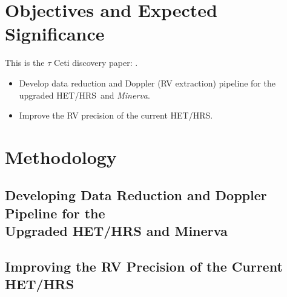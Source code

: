 \documentclass[12pt]{article}
\def\minerva{{\it Minerva}}
\def\hrs{HET/HRS}
\begin{document}

\section{Objectives and Expected Significance}






This is the $\tau$ Ceti discovery paper: \cite{tuomi2013}.

\begin{itemize}[leftmargin=2.2em]
    \vspace{-3pt}
\item Develop data reduction and Doppler (RV extraction) pipeline
  for the upgraded \hrs\ and \minerva.
    \vspace{-3pt}
\end{itemize}


\begin{itemize}[leftmargin=2.2em]
  \vspace{-3pt}
\item Improve the RV precision of the current \hrs.
  \vspace{-3pt}
\end{itemize}




\vspace{-3pt}
\section{Methodology}


\vspace{-3pt}
\subsection{Developing Data Reduction and Doppler Pipeline for the \\
  Upgraded HET/HRS and Minerva}\label{develop} 

\vspace{-3pt}
\subsection{Improving the RV Precision of the Current HET/HRS}
\end{document}
